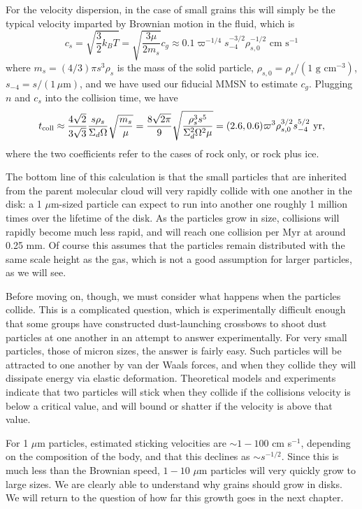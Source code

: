 For the velocity dispersion, in the case of small grains this will simply be the typical velocity imparted by Brownian motion in the fluid, which is
\begin{equation}
c_s = \sqrt{\frac{3}{2} k_B T} = \sqrt{\frac{3 \mu}{2 m_s}} c_g \approx 0.1 \varpi^{-1/4} s_{-4}^{-3/2} \rho_{s,0}^{-1/2}\mbox{ cm s}^{-1}
\end{equation}
where $m_s = (4/3)\pi s^3 \rho_s$ is the mass of the solid particle, $\rho_{s,0}=\rho_s/(1\mbox{ g cm}^{-3})$, $s_{-4} = s/(1\,\mu\mbox{m})$, and we have used our fiducial MMSN to estimate $c_g$. Plugging $n$ and $c_s$ into the collision time, we have
\begin{equation}
t_{\rm coll} \approx \frac{4\sqrt{2}}{3\sqrt{3}}\frac{s\rho_s}{\Sigma_d \Omega}\sqrt{\frac{m_s}{\mu}} = \frac{8\sqrt{2\pi}}{9} \sqrt{\frac{\rho_s^3 s^5}{\Sigma_d^2\Omega^2 \mu}} = (2.6, 0.6) \varpi^3 \rho_{s,0}^{3/2} s_{-4}^{5/2}\mbox{ yr},
\end{equation}
where the two coefficients refer to the cases of rock only, or rock plus ice.

The bottom line of this calculation is that the small particles that are inherited from the parent molecular cloud will very rapidly collide with one another in the disk: a 1 $\mu$m-sized particle can expect to run into another one roughly 1 million times over the lifetime of the disk. As the particles grow in size, collisions will rapidly become much less rapid, and will reach one collision per Myr at around 0.25 mm. Of course this assumes that the particles remain distributed with the same scale height as the gas, which is not a good assumption for larger particles, as we will see.

Before moving on, though, we must consider what happens when the particles collide. This is a complicated question, which is experimentally difficult enough that some groups have constructed dust-launching crossbows to shoot dust particles at one another in an attempt to answer experimentally. For very small particles, those of micron sizes, the answer is fairly easy. Such particles will be attracted to one another by van der Waals forces, and when they collide they will dissipate energy via elastic deformation. Theoretical models and experiments indicate that two particles will stick when they collide if the collisions velocity is below a critical value, and will bound or shatter if the velocity is above that value.

For 1 $\mu$m particles, estimated sticking velocities are $\sim 1-100$ cm s$^{-1}$, depending on the composition of the body, and that this declines as $\sim s^{-1/2}$. Since this is much less than the Brownian speed, $1-10$ $\mu$m particles will very quickly grow to large sizes. We are clearly able to understand why grains should grow in disks. We will return to the question of how far this growth goes in the next chapter.


